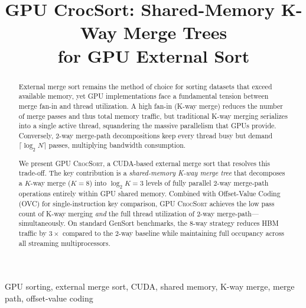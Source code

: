 \documentclass[conference,10pt]{IEEEtran}
\newcommand{\gpucrocsort}{\textsc{GPU CrocSort}\xspace}
\newcommand{\ovc}{\textsc{OVC}\xspace}
\begin{document}
\title{GPU CrocSort: Shared-Memory K-Way Merge Trees\\for GPU External Sort}

\author{
}

\maketitle

\begin{abstract}
External merge sort remains the method of choice for sorting datasets that
exceed available memory, yet GPU implementations face a fundamental tension
between merge fan-in and thread utilization.  A high fan-in (K-way merge)
reduces the number of merge passes and thus total memory traffic, but
traditional K-way merging serializes into a single active thread, squandering
the massive parallelism that GPUs provide.  Conversely, 2-way merge-path
decompositions keep every thread busy but demand $\lceil\log_2 N\rceil$
passes, multiplying bandwidth consumption.

We present \gpucrocsort, a CUDA-based external merge sort that resolves this
trade-off.  The key contribution is a \emph{shared-memory K-way merge tree}
that decomposes a $K$-way merge ($K{=}8$) into $\log_2 K{=}3$ levels of
fully parallel 2-way merge-path operations entirely within GPU shared memory.
Combined with Offset-Value Coding (\ovc) for single-instruction key
comparison, \gpucrocsort achieves the low pass count of K-way merging
\emph{and} the full thread utilization of 2-way merge-path---simultaneously.
On standard GenSort benchmarks, the 8-way strategy reduces HBM traffic by
$3\times$ compared to the 2-way baseline while maintaining full occupancy
across all streaming multiprocessors.
\end{abstract}

\begin{IEEEkeywords}
GPU sorting, external merge sort, CUDA, shared memory, K-way merge,
merge path, offset-value coding
\end{IEEEkeywords}

\end{document}
